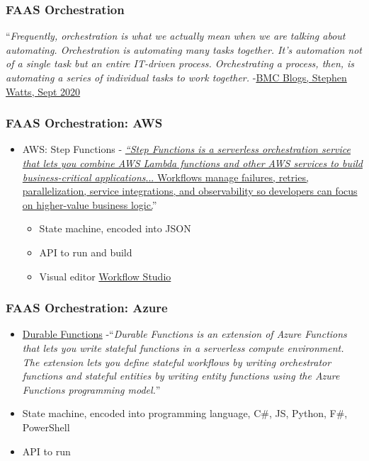 \documentclass[11pt,aspectratio=169]{beamer}
\begin{document}
\begin{nrcanFrame}
  \frametitle{FAAS Orchestration}
  ``\textit{Frequently, orchestration is what we actually mean when we
    are talking about automating. Orchestration is automating many
    tasks together. It’s automation not of a single task but an entire
    IT-driven process. Orchestrating a process, then, is automating a
    series of individual tasks to work together.}
  -\href{https://www.bmc.com/blogs/it-orchestration-vs-automation-whats-the-difference/}
       {BMC Blogs, Stephen Watts, Sept 2020}

\end{nrcanFrame}

\begin{nrcanFrame}
  \frametitle{FAAS Orchestration: AWS}
  \begin{itemize}
  \item AWS: Step Functions -
             \href{https://docs.aws.amazon.com/step-functions/index.html}{\textit{``Step Functions is a serverless
      orchestration service that lets you combine AWS Lambda functions
      and other AWS services to build business-critical
      applications}...\href{https://aws.amazon.com/step-functions/?step-functions.sort-by=item.additionalFields.postDateTime&step-functions.sort-order=desc}{
           Workflows \alert{manage failures, retries, parallelization,}
           service integrations, and observability so developers can
           focus on higher-value business logic.}}''
    \begin{itemize}
    \item State machine, encoded into JSON
    \item API to run \alert{and build}
    \item Visual editor
      \href{https://docs.aws.amazon.com/step-functions/latest/dg/workflow-studio.html}
      {Workflow Studio}
    \end{itemize}
  \end{itemize}
\end{nrcanFrame}

\begin{nrcanFrame}
  \frametitle{FAAS Orchestration: Azure}
    \begin{itemize}
    \item \href{https://docs.microsoft.com/en-us/azure/azure-functions/durable/}
         {Durable Functions}
         -``\textit{Durable Functions is an extension of Azure
           Functions that lets you write stateful functions in a
           serverless compute environment. The extension lets you
           define stateful workflows by writing orchestrator functions
           and stateful entities by writing entity functions using the
           Azure Functions programming model.}''
       \item State machine, encoded into programming language, C\#,
         JS, Python, F\#, PowerShell
       \item API \alert{to run}
    \end{itemize}
\end{nrcanFrame}
\end{document}

